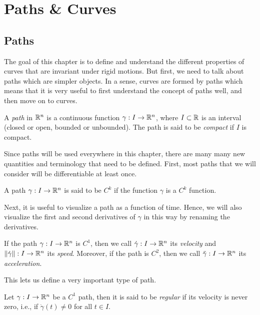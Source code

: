 \section{Paths \& Curves}

\subsection{Paths}

The goal of this chapter is to define and understand the different properties of curves that are invariant under rigid motions. But first, we need to talk about paths which are simpler objects. In a sense, curves are formed by paths which means that it is very useful to first understand the concept of paths well, and then move on to curves.

\begin{definition}
    A \textit{path} in $\mathbb{R}^n$ is a continuous function $\gamma : I \to \mathbb{R}^n$, where $I \subset \mathbb{R}$ is an interval (closed or open, bounded or unbounded). The path is said to be \textit{compact} if $I$ is compact.
\end{definition}

Since paths will be used everywhere in this chapter, there are many many new quantities and terminology that need to be defined. First, most paths that we will consider will be differentiable at least once. 

\begin{definition}
    A path $\gamma : I \to \mathbb{R}^n$ is said to be $C^k$ if the function $\gamma$ is a $C^k$ function.
\end{definition}

Next, it is useful to visualize a path as a function of time. Hence, we will also visualize the first and second derivatives of $\gamma$ in this way by renaming the derivatives.

\begin{definition}
    If the path $\gamma : I \to \mathbb{R}^n$ is $C^1$, then we call $\dot{\gamma} : I \to \mathbb{R}^n$ its \textit{velocity} and $\left\lVert\dot{\gamma} \right\rVert : I \to \mathbb{R}^n$ its \textit{speed}. Moreover, if the path is $C^2$, then we call $\ddot{\gamma} : I \to \mathbb{R}^n$ its \textit{acceleration}.
\end{definition}

This lets us define a very important type of path.

\begin{definition}
    Let $\gamma : I \to \mathbb{R}^n$ be a $C^1$ path, then it is said to be \textit{regular} if its velocity is never zero, i.e., if $\dot{\gamma}(t) \neq 0$ for all $t \in I$.
\end{definition}

